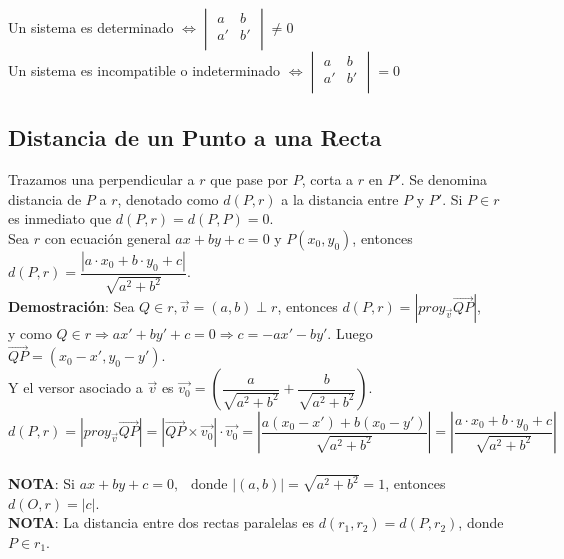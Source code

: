 \documentclass[11pt,a4paper]{article}
\begin{document}
\noindent Un sistema es determinado $\iff \begin{vmatrix}a&b\\a'&b'\\\end{vmatrix} \not = 0$\\
\noindent Un sistema es incompatible o indeterminado $\iff \begin{vmatrix}a&b\\a'&b'\\\end{vmatrix} = 0$

\subsection{Distancia de un Punto a una Recta}
Trazamos una perpendicular a $r$ que pase por $P$, corta a $r$ en $P'$. Se denomina distancia de $P$ a $r$, denotado como $d(P,r)$ a la distancia entre $P$ y $P'$. Si $P\in r$ es inmediato que $d(P,r)=d(P,P)=0$.\\
\noindent Sea $r$ con ecuaci\'on general $ax+by+c=0$ y $P(x_0,y_0)$, entonces $d(P,r) = \dfrac{|a\cdot x_0 + b \cdot y_0 + c|}{\sqrt{a^2+b^2}}$.\\
\textbf{Demostraci\'on}: Sea $Q \in r, \overrightarrow{v}=(a,b) \perp r$, entonces $d(P,r)=|proy_{\overrightarrow{v}}\overrightarrow{QP}|$,\\ y como $Q \in r \Rightarrow ax'+by'+c=0 \Rightarrow c= -ax'-by'$. Luego $\overrightarrow{QP} = (x_0 - x', y_0 - y')$.\\ Y el versor asociado a $\overrightarrow{v}$ es $\overrightarrow{v_0} = \left(\dfrac{a}{\sqrt{a^2+b^2}} + \dfrac{b}{\sqrt{a^2+b^2}}\right)$.\\ $d(P,r) = |proy_{\overrightarrow{v}}\overrightarrow{QP}| = |\overrightarrow{QP} \times \overrightarrow{v_0}| \cdot \overrightarrow{v_0} = \left| \dfrac{a(x_0 - x') + b (x_0-y')}{\sqrt{a^2+b^2}} \right| = \left|\dfrac{a \cdot x_0+b \cdot y_0+c}{\sqrt{a^2+b^2}}\right|$\\ \\

\noindent \textbf{NOTA}: Si $ax+by + c = 0,\ \ \text{ donde } |(a,b)| = \sqrt{a^2+b^2} = 1$, entonces $d(O,r) = |c|$.\\
\textbf{NOTA}: La distancia entre dos rectas paralelas es $d(r_1,r_2) = d(P,r_2)$, donde $P\in r_1$.
\end{document}
